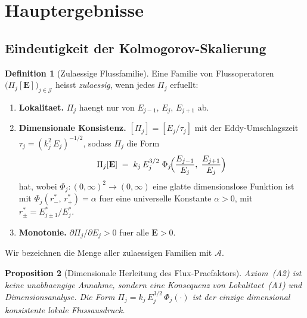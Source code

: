 \documentclass[12pt,a4paper]{article}
\theoremstyle{definition}
\newtheorem{definition}{Definition}[section]
\theoremstyle{plain}
\newtheorem{proposition}[definition]{Proposition}
\theoremstyle{remark}
\begin{document}
\section{Hauptergebnisse}\label{sec:results}

\subsection{Eindeutigkeit der Kolmogorov-Skalierung}

\begin{definition}[Zulaessige Flussfamilie]\label{def:admissible}
Eine Familie von Flussoperatoren $\bigl(\Pi_j[\mathbf{E}]\bigr)_{j \in
\mathcal{J}}$ heisst \emph{zulaessig}, wenn jedes $\Pi_j$ erfuellt:
\begin{enumerate}
  \item[\textup{(A1)}] \textbf{Lokalitaet.}\;
    $\Pi_j$ haengt nur von $E_{j-1},\, E_j,\, E_{j+1}$ ab.
  \item[\textup{(A2)}] \textbf{Dimensionale Konsistenz.}\;
    $[\Pi_j] = [E_j / \tau_j]$ mit der Eddy-Umschlagszeit
    $\tau_j = (k_j^2\,E_j)^{-1/2}$, sodass $\Pi_j$ die Form
    \begin{equation}\label{eq:closure_general}
      \Pi_j[\mathbf{E}]
      \;=\;
      k_j\,E_j^{3/2}\;\Phi_j\!\Bigl(
        \frac{E_{j-1}}{E_j},\;
        \frac{E_{j+1}}{E_j}
      \Bigr)
    \end{equation}
    hat, wobei $\Phi_j : (0,\infty)^2 \to (0,\infty)$ eine glatte
    dimensionslose Funktion ist mit $\Phi_j(r^*_{-},\, r^*_{+}) = \alpha$
    fuer eine universelle Konstante $\alpha > 0$, mit
    $r^*_{\pm} = E_{j \pm 1}^* / E_j^*$.
  \item[\textup{(A3)}] \textbf{Monotonie.}\;
    $\partial \Pi_j / \partial E_j > 0$ fuer alle $\mathbf{E} > 0$.
\end{enumerate}
Wir bezeichnen die Menge aller zulaessigen Familien mit $\mathscr{A}$.
\end{definition}

\begin{proposition}[Dimensionale Herleitung des Flux-Praefaktors]\label{prop:A2-derived}
Axiom~\textup{(A2)} ist keine unabhaengige Annahme, sondern eine Konsequenz von Lokalitaet~\textup{(A1)} und Dimensionsanalyse. Die Form $\Pi_j = k_j\,E_j^{3/2}\,\Phi_j(\cdot)$ ist der \emph{einzige} dimensional konsistente lokale Flussausdruck.
\end{proposition}
\end{document}
